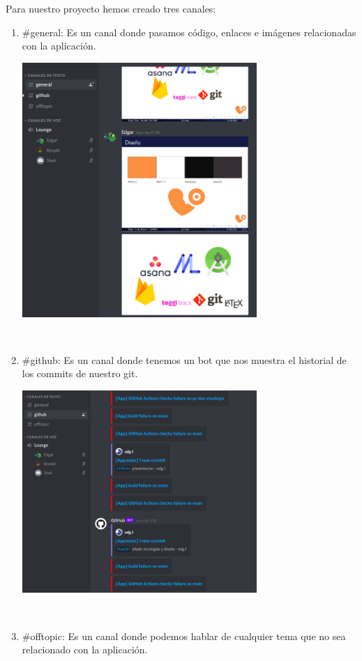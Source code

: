 \documentclass[12pt,a4paper]{article}
\begin{document}
\begin{minipage}{.75\textwidth}
Para nuestro proyecto hemos creado tres canales:
 
\begin{enumerate}
\item \#general: Es un canal donde pasamos código, enlaces e imágenes relacionadas con la aplicación.\\

\begin{minipage}{.50\textwidth}
  \includegraphics[width=0.7\textwidth, right]{general}
\end{minipage}\\


\item \#github: Es un canal donde tenemos un bot que nos muestra el historial de los commits de nuestro git.\\

\begin{minipage}{.50\textwidth}
  \includegraphics[width=0.7\textwidth, right]{github}
\end{minipage}\\

\item \#offtopic: Es un canal donde podemos hablar de cualquier tema que no sea relacionado con la aplicación.\\

\end{enumerate} 
\end{minipage}
\end{document}
